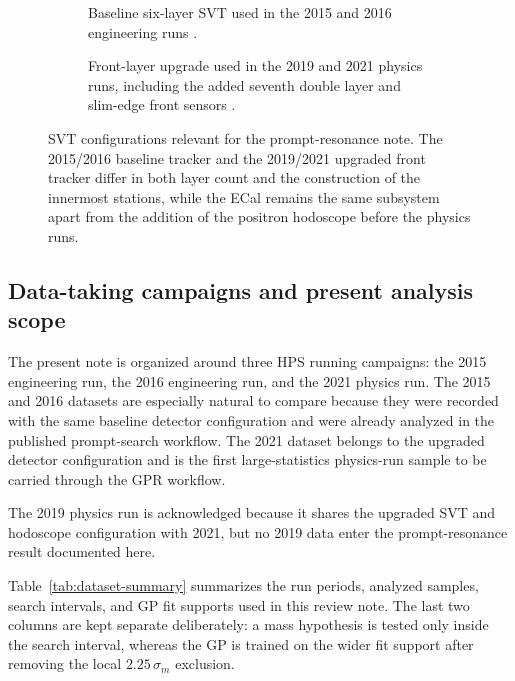 \begin{figure}[H]
\centering
\begin{subfigure}[t]{0.90\linewidth}
  \centering
  \caption{Baseline six-layer SVT used in the 2015 and 2016 engineering runs
  \cite{HPS2016BumpInternal}.}
\end{subfigure}

\vspace{0.9em}

\begin{subfigure}[t]{0.78\linewidth}
  \centering
  \caption{Front-layer upgrade used in the 2019 and 2021 physics runs, including the
  added seventh double layer and slim-edge front sensors
  \cite{HPSExperiment2022,HPSSlimEdgeSensors2020}.}
\end{subfigure}
\caption{SVT configurations relevant for the prompt-resonance note. The 2015/2016
baseline tracker and the 2019/2021 upgraded front tracker differ in both layer count
and the construction of the innermost stations, while the ECal remains the same
subsystem apart from the addition of the positron hodoscope before the physics runs.}
\label{fig:hps-svt-eras}
\end{figure}

\subsection{Data-taking campaigns and present analysis scope}

The present note is organized around three HPS running campaigns: the 2015 engineering
run, the 2016 engineering run, and the 2021 physics run. The 2015 and 2016 datasets
are especially natural to compare because they were recorded with the same baseline
detector configuration and were already analyzed in the published prompt-search
workflow. The 2021 dataset belongs to the upgraded detector configuration and is the
first large-statistics physics-run sample to be carried through the GPR workflow.

The 2019 physics run is acknowledged because it shares the upgraded SVT and hodoscope
configuration with 2021, but no 2019 data enter the prompt-resonance result documented
here.

Table~\ref{tab:dataset-summary} summarizes the run periods, analyzed samples, search
intervals, and GP fit supports used in this review note. The last two columns are kept
separate deliberately: a mass hypothesis is tested only inside the search interval,
whereas the GP is trained on the wider fit support after removing the local
$2.25\,\sigma_m$ exclusion.

